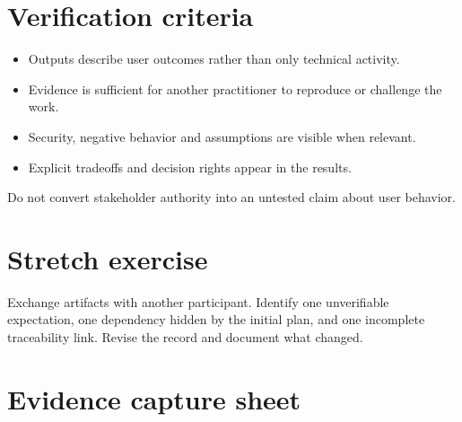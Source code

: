 \documentclass[11pt,letterpaper]{article}
\begin{document}
\section{Verification criteria}
\begin{itemize}[leftmargin=*,itemsep=2pt]
\item Outputs describe user outcomes rather than only technical activity.
\item Evidence is sufficient for another practitioner to reproduce or challenge the work.
\item Security, negative behavior and assumptions are visible when relevant.
\item Explicit tradeoffs and decision rights appear in the results.
\end{itemize}
\begin{tcolorbox}[colback=amberback,colframe=navy,title={Instructor note / expected reasoning},breakable]
Do not convert stakeholder authority into an untested claim about user behavior.

\end{tcolorbox}
\section{Stretch exercise}
Exchange artifacts with another participant. Identify one unverifiable expectation, one dependency hidden by the initial plan, and one incomplete traceability link. Revise the record and document what changed.

\section{Evidence capture sheet}
\end{document}
